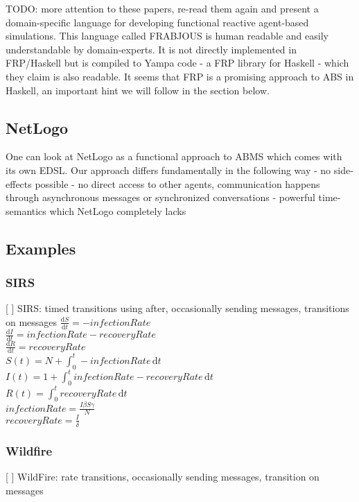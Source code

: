 TODO: more attention to these papers, re-read them again
\cite{schneider_towards_2012} and \cite{vendrov_frabjous:_2014} present a domain-specific language for developing functional reactive agent-based simulations. This language called FRABJOUS is human readable and easily understandable by domain-experts. It is not directly implemented in FRP/Haskell but is compiled to Yampa code - a FRP library for Haskell - which they claim is also readable. It seems that FRP is a promising approach to ABS in Haskell, an important hint we will follow in the section below.


\subsection{NetLogo}
One can look at NetLogo as a functional approach to ABMS which comes with its own EDSL. Our approach differs fundamentally in the following way
	- no side-effects possible
	- no direct access to other agents, communication happens through asynchronous messages or synchronized conversations
	- powerful time-semantics which NetLogo completely lacks 
	
\subsection{Examples}

\subsubsection{SIRS}
[ ] SIRS: timed transitions using after, occasionally sending messages, transitions on messages
$\frac{\mathrm d S}{\mathrm d t} = -infectionRate$ \\
$\frac{\mathrm d I}{\mathrm d t} = infectionRate - recoveryRate$ \\
$\frac{\mathrm d R}{\mathrm d t} = recoveryRate$ \\

$S(t) = N + \int_0^t -infectionRate\, \mathrm{d}t$ \\
$I(t) = 1 + \int_0^t infectionRate - recoveryRate\, \mathrm{d}t$ \\
$R(t) = \int_0^t recoveryRate\, \mathrm{d}t$ \\

$infectionRate = \frac{I \beta S \gamma}{N}$ \\
$recoveryRate = \frac{I}{\delta}$ \\
\subsubsection{Wildfire}
[ ] WildFire: rate transitions, occasionally sending messages, transition on messages